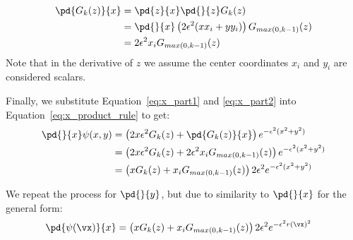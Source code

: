 \documentclass[11pt]{report}
\begin{document}
{%

\begin{align}
\pd{G_k(z)}{x} & = \pd{z}{x} \pd{}{z} G_k(z) \nonumber \\
               & = \pd{}{x} \left( 2\epsilon^2(x x_i + y y_i) \right) G_{max(0,k-1)}(z) \nonumber \\ 
               & = 2 \epsilon^2 x_i G_{max(0,k-1)}( z ) \label{eq:x_part2}
\end{align}
Note that in the derivative of $z$ we assume the center coordinates $x_i$ and $y_i$ are considered scalars. 


Finally, we substitute Equation~\ref{eq:x_part1} and \ref{eq:x_part2} into Equation~\ref{eq:x_product_rule} to get:
\begin{align}
\pd{}{x}\psi(x,y) & = \left( 2x\epsilon^2 G_k(z) + \pd{G_k(z)}{x} \right) e^{-\epsilon^2(x^2 + y^2)} \nonumber \\
                 & = \left( 2x\epsilon^2 G_k(z) + 2 \epsilon^2 x_i G_{max(0,k-1)}( z )  \right) e^{-\epsilon^2(x^2 + y^2)}  \nonumber \\
                 & = \left( x G_{k}(z) + x_i G_{max(0,k-1)}(z) \right) 2 \epsilon^2 e^{-\epsilon^2(x^2+y^2)}\label{eq:rbf_ga_xderiv}
\end{align}

We repeat the process for $\pd{}{y}$, but due to similarity to $\pd{}{x}$ for the general form: 
\begin{align}
\pd{\psi(\vx)}{x}   & = \left( x G_k(z) + x_i G_{max(0,k-1)}( z )  \right) 2\epsilon^2 e^{-\epsilon^2 r(\vx)^2} \label{eq:rbf_ga_yderiv}
\end{align}


}
\end{document}

